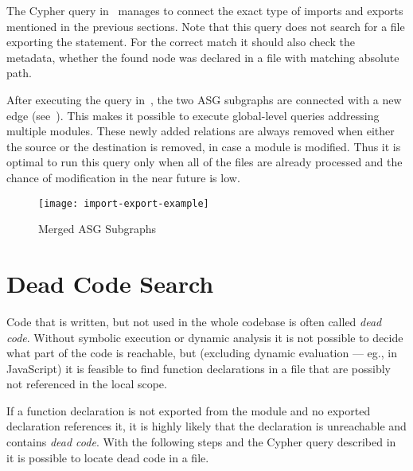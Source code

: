 The Cypher query in~ manages to connect the exact type of imports and exports mentioned in the previous sections. Note that this query does not search for a file exporting the statement. For the correct match it should also check the metadata, whether the found node was declared in a file with matching absolute path.

\begin{figure}[!htb]
	\begin{minipage}{\textwidth}
		
	\end{minipage}
\end{figure}

After executing the query in~, the two ASG subgraphs are connected with a new edge (see~). This makes it possible to execute global-level queries addressing multiple modules. These newly added relations are always removed when either the source or the destination is removed, in case a module is modified. Thus it is optimal to run this query only when all of the files are already processed and the chance of modification in the near future is low.

\begin{sidewaysfigure}[htbp]
  \centering
  \texttt{[image: import-export-example]}
  \caption{Merged ASG Subgraphs}
  \label{fig:import-export-example}
\end{sidewaysfigure}


\section{Dead Code Search}
Code that is written, but not used in the whole codebase is often called \emph{dead code}. Without symbolic execution or dynamic analysis it is not possible to decide what part of the code is reachable, but (excluding dynamic evaluation --- eg.,  in JavaScript) it is feasible to find function declarations in a file that are possibly not referenced in the local scope.

If a function declaration is not exported from the module and no exported declaration references it, it is highly likely that the declaration is unreachable and contains \emph{dead code}. With the following steps and the Cypher query described in~ it is possible to locate dead code in a file.

